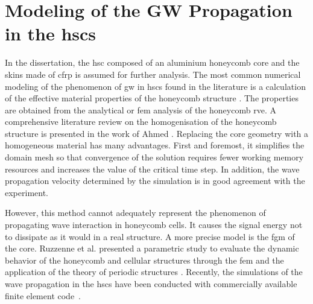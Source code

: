 \section{Modeling of the GW Propagation in the \acp{hsc}}
\label{sec:modelling}



In the dissertation, the \ac{hsc} composed of an aluminium honeycomb core and the skins made of \ac{cfrp} is assumed for further analysis.
The most common numerical modeling of the phenomenon of \ac{gw} in \acp{hsc} found in the literature is a calculation of the effective material properties of the honeycomb structure \cite{baid2015dispersion, mustapha2014leaky, qi2008ultrasonic,  shi1995derivation, sikdar2016guided}.
The properties are obtained from the analytical \cite{gibson1982mechanics, malek2015effective} or \ac{fem} \cite{catapano2014multi, chen2014analysis} analysis of the honeycomb \ac{rve}.
A comprehensive literature review on the homogenisation of the honeycomb structure is presented in the work of Ahmed \cite{ahmed2019homogenization}.
Replacing the core geometry with a homogeneous material has many advantages.
First and foremost, it simplifies the domain mesh so that convergence of the solution requires fewer working memory resources and increases the value of the critical time step.
In addition, the wave propagation velocity determined by the simulation is in good agreement with the experiment.

However, this method cannot adequately represent the phenomenon of propagating wave interaction in honeycomb cells.
It causes the signal energy not to dissipate as it would in a real structure.
A more precise model is the \ac{fgm} of the core. 
Ruzzenne et al. presented a parametric study to evaluate the dynamic behavior of the honeycomb and cellular structures through the \ac{fem} and the application of the theory of periodic structures \cite{ruzzene2003wave}.
Recently, the simulations of the wave propagation in the \acp{hsc} have been conducted with commercially available finite element code~\cite{song2009guided, hosseini2013numerical, tian2015wavenumber, zhao2018wave}.


